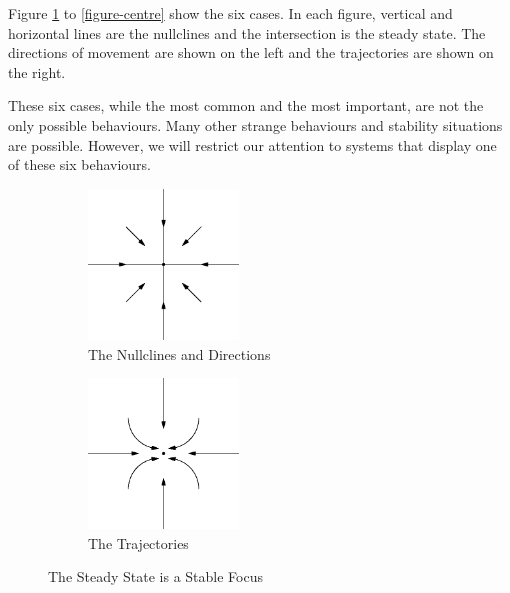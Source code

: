 \documentclass[fleqn,letterpaper]{report}
\begin{document}
Figure \ref{figure-stable-focus} to \ref{figure-centre} show the six cases.
In each figure, vertical and horizontal lines are the
nullclines and the intersection is the steady state. The
directions of movement are shown on the left and the
trajectories are shown on the right.

These six cases, while the most common and the most important,
are not the only possible behaviours. Many other strange
behaviours and stability situations are possible. However, we
will restrict our attention to systems that display one of
these six behaviours.

\begin{figure}[h!]
\centering
\begin{subfigure}{.5\textwidth}
\centering
\includegraphics[width=4cm]{figure30.eps}
\caption{The Nullclines and Directions}
\end{subfigure}%
\begin{subfigure}{.5\textwidth}
\centering
\includegraphics[width=4cm]{figure46.eps}
\caption{The Trajectories}
\end{subfigure}
\caption{The Steady State is a Stable Focus}
\label{figure-stable-focus}
\end{figure}
\end{document}
